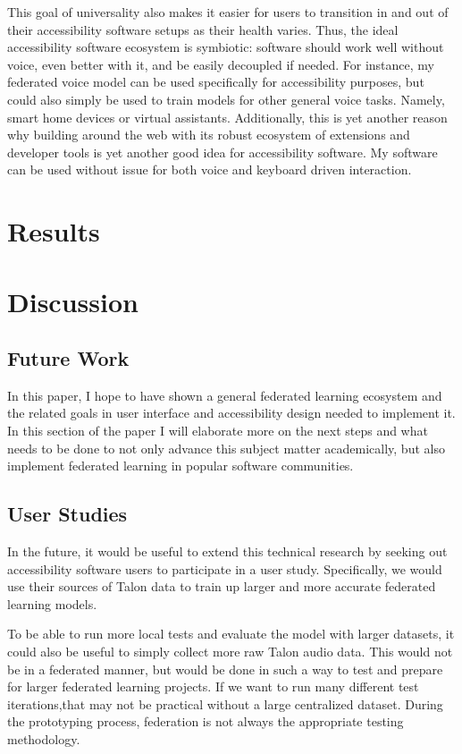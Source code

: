 \documentclass[manuscript,screen,review]{acmart}
\begin{document}
{This goal of universality also makes it easier for users to transition in and out of their accessibility software setups as their health varies. Thus, the ideal accessibility software ecosystem is symbiotic: software should work well without voice, even better with it, and be easily decoupled if needed. For instance, my federated voice model can be used specifically for accessibility purposes, but could also simply be used to train models for other general voice tasks. Namely, smart home devices or virtual assistants. Additionally, this is yet another reason why building around the web with its robust ecosystem of extensions and developer tools is yet another good idea for accessibility software. My software can be used without issue for both voice and keyboard driven interaction.


\section{Results}


\section{Discussion}
\subsection{Future Work}

In this paper, I hope to have shown a general federated learning ecosystem and the related goals in user interface and accessibility design needed to implement it. In this section of the paper I will elaborate more on the next steps and what needs to be done to not only advance this subject matter academically, but also implement federated learning in popular software communities.

\subsection{User Studies}

In the future, it would be useful to extend this technical research by seeking out accessibility software users to participate in a user study. Specifically, we would use their sources of Talon data to train up larger and more accurate federated learning models.

To be able to run more local tests and evaluate the model with larger datasets, it could also be useful to simply collect more raw Talon audio data. This would not be in a federated manner, but would be done in such a way to test and prepare for larger federated learning projects. If we want to run many different test iterations,that may not be practical without a large centralized dataset. During the prototyping process, federation is not always the appropriate testing methodology.

}
\end{document}
